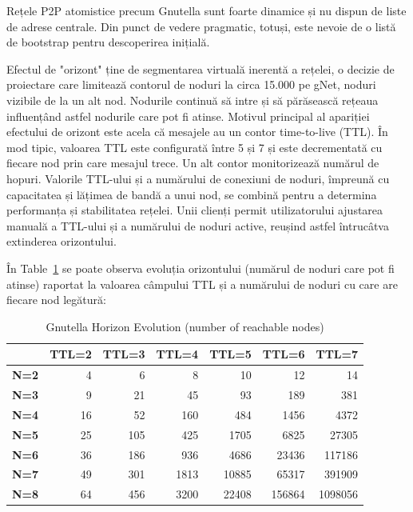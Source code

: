 Rețele P2P atomistice precum Gnutella sunt foarte dinamice și nu dispun de
liste de adrese centrale. Din punct de vedere pragmatic, totuși, este nevoie
de o listă de bootstrap pentru descoperirea inițială.

Efectul de "orizont" ține de segmentarea virtuală inerentă a rețelei, o
decizie de proiectare care limitează contorul de noduri la circa 15.000 pe
gNet, noduri vizibile de la un alt nod. Nodurile continuă să intre și să
părăsească rețeaua influențând astfel nodurile care pot fi atinse. Motivul
principal al apariției efectului de orizont este acela că mesajele au un
contor time-to-live (TTL). În mod tipic, valoarea TTL este configurată între 5
și 7 și este decrementată cu fiecare nod prin care mesajul trece. Un alt
contor monitorizează numărul de hopuri. Valorile TTL-ului și a numărului de
conexiuni de noduri, împreună cu capacitatea și lățimea de bandă a unui nod,
se combină pentru a determina performanța și stabilitatea rețelei. Unii
clienți permit utilizatorului ajustarea manuală a TTL-ului și a numărului de
noduri active, reușind astfel întrucâtva extinderea orizontului.

În Table~\ref{tab:p2p-systems:gnutella-horizon} se poate observa evoluția
orizontului (numărul de noduri care pot fi atinse) raportat la valoarea
câmpului TTL și a numărului de noduri cu care are fiecare nod legătură:

\begin{table}[htb]
  \centering
  \caption{Gnutella Horizon Evolution (number of reachable nodes)}
  \label{tab:p2p-systems:gnutella-horizon}
  \begin{tabular}{@{}lrrrrrr@{}}
    \toprule
      & \textbf{TTL=2} & \textbf{TTL=3} & \textbf{TTL=4} & \textbf{TTL=5} &
      \textbf{TTL=6} & \textbf{TTL=7} \\
    \midrule
      \textbf{N=2} & 4 & 6 & 8 & 10 & 12 & 14 \\
      \textbf{N=3} & 9 & 21 & 45 & 93 & 189 & 381 \\
      \textbf{N=4} & 16 & 52 & 160 & 484 & 1456 & 4372 \\
      \textbf{N=5} & 25 & 105 & 425 & 1705 & 6825 & 27305 \\
      \textbf{N=6} & 36 & 186 & 936 & 4686 & 23436 & 117186 \\
      \textbf{N=7} & 49 & 301 & 1813 & 10885 & 65317 & 391909 \\
      \textbf{N=8} & 64 & 456 & 3200 & 22408 & 156864 & 1098056 \\
    \bottomrule
  \end{tabular}
\end{table}

